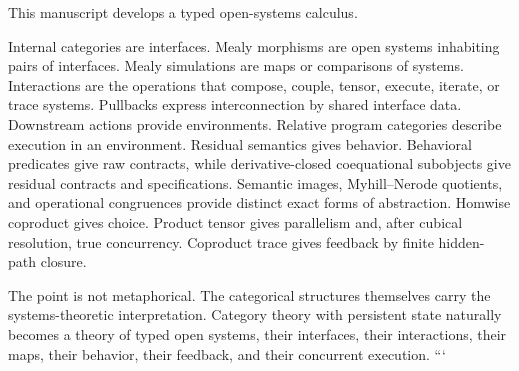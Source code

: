 This manuscript develops a typed open-systems calculus.

Internal categories are interfaces.  Mealy morphisms are open systems
inhabiting pairs of interfaces.  Mealy simulations are maps or comparisons of
systems.  Interactions are the operations that compose, couple, tensor,
execute, iterate, or trace systems.  Pullbacks express interconnection by
shared interface data.  Downstream actions provide environments.  Relative
program categories describe execution in an environment.  Residual semantics
gives behavior.  Behavioral predicates give raw contracts, while
derivative-closed coequational subobjects give residual contracts and
specifications.  Semantic images, Myhill--Nerode quotients, and operational
congruences provide distinct exact forms of abstraction.  Homwise coproduct
gives choice.  Product tensor gives parallelism and, after cubical resolution,
true concurrency.  Coproduct trace gives feedback by finite hidden-path
closure.

The point is not metaphorical.  The categorical structures themselves carry
the systems-theoretic interpretation.  Category theory with persistent state
naturally becomes a theory of typed open systems, their interfaces, their
interactions, their maps, their behavior, their feedback, and their concurrent
execution.
```
